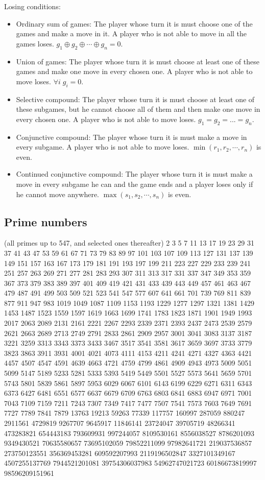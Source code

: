 \documentclass[letterpaper]{article}
\begin{document}
Losing conditions:
\begin{itemize}
    \item Ordinary sum of games: The player whose turn it is must choose one of the games and make a move in it. A player who is not able to move in all the games loses. $g_1 \oplus g_2 \oplus \cdots \oplus g_n = 0$.
    \item Union of games: The player whose turn it is must choose at least one of these games and make one move in every chosen one.  A player who is not able to move loses. $\forall i \; g_i=0$.
    \item Selective compound: The player whose turn it is must choose at least one of these subgames, but he cannot choose all of them and then make one move in every chosen one. A player who is not able to move loses. $g_1=g_2=...=g_n$.
    \item Conjunctive compound: The player whose turn it is must make a move in every subgame. A player who is not able to move loses. $\min(r_1,r_2,\cdots,r_n)$ is even.
    \item Continued conjunctive compound: The player whose turn it is must make a move in every subgame he can and the game ends and a player loses only if he cannot move anywhere. $\max(s_1,s_2,\cdots,s_n)$ is even.
\end{itemize}

\subsection{Prime numbers}

(all primes up to 547, and selected ones thereafter) 2 3 5 7 11 13 17 19 23 29 31 37 41 43 47 53 59 61 67 71 73 79 83 89 97 101 103 107 109 113 127 131 137 139 149 151 157 163 167 173 179 181 191 193 197 199 211 223 227 229 233 239 241 251 257 263 269 271 277 281 283 293 307 311 313 317 331 337 347 349 353 359 367 373 379 383 389 397 401 409 419 421 431 433 439 443 449 457 461 463 467 479 487 491 499 503 509 521 523 541 547 577 607 641 661 701 739 769 811 839 877 911 947 983 1019 1049 1087 1109 1153 1193 1229 1277 1297 1321 1381 1429 1453 1487 1523 1559 1597 1619 1663 1699 1741 1783 1823 1871 1901 1949 1993 2017 2063 2089 2131 2161 2221 2267 2293 2339 2371 2393 2437 2473 2539 2579 2621 2663 2689 2713 2749 2791 2833 2861 2909 2957 3001 3041 3083 3137 3187 3221 3259 3313 3343 3373 3433 3467 3517 3541 3581 3617 3659 3697 3733 3779 3823 3863 3911 3931 4001 4021 4073 4111 4153 4211 4241 4271 4327 4363 4421 4457 4507 4547 4591 4639 4663 4721 4759 4799 4861 4909 4943 4973 5009 5051 5099 5147 5189 5233 5281 5333 5393 5419 5449 5501 5527 5573 5641 5659 5701 5743 5801 5839 5861 5897 5953 6029 6067 6101 6143 6199 6229 6271 6311 6343 6373 6427 6481 6551 6577 6637 6679 6709 6763 6803 6841 6883 6947 6971 7001 7043 7109 7159 7211 7243 7307 7349 7417 7477 7507 7541 7573 7603 7649 7691 7727 7789 7841 7879 13763 19213 59263 77339 117757 160997 287059 880247 2911561 4729819 9267707 9645917 11846141 23724047 39705719 48266341 473283821 654443183 793609931 997244057 8109530161 8556038527 8786201093 9349430521 70635580657 73695102059 79852211099 97982641721 219037536857 273750123551 356369453281 609592207993 2119196502847 3327101349167 4507255137769 7944521201081 39754306037983 54962747021723 60186673819997 98596209151961
\end{document}

